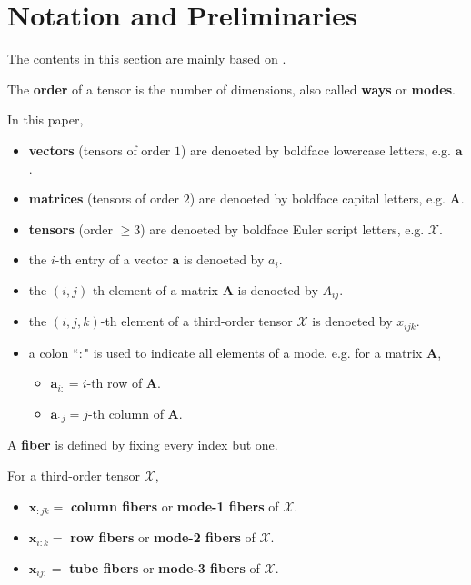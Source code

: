 \documentclass[preprint]{elsarticle}
\begin{document}
\section{Notation and Preliminaries}
\noindent The contents in this section are mainly based on \cite{Kolda2009}.
\begin{defn}
    The \textbf{order} of a tensor is the number of dimensions, also called \textbf{ways} or \textbf{modes}.
\end{defn}
In this paper,
\begin{itemize}
    \item \textbf{vectors} (tensors of order $1$) are denoeted by boldface lowercase letters, e.g. $\mathbf{a}$.
    \item \textbf{matrices} (tensors of order $2$) are denoeted by boldface capital letters, e.g. $\mathbf{A}$.
    \item \textbf{tensors} (order $\geq 3$) are denoeted by boldface Euler script letters, e.g. $\boldsymbol{\mathscr{X}}$.
    \item the $i$-th entry of a vector $\mathbf{a}$ is denoeted by $a_i$.
    \item the $(i,j)$-th element of a matrix $\mathbf{A}$ is denoeted by $A_{ij}$.
    \item the $(i,j,k)$-th element of a third-order tensor $\boldsymbol{\mathscr{X}}$ is denoeted by $x_{ijk}$.
    \item a colon ``$:$" is used to indicate all elements of a mode. e.g. for a matrix $\mathbf{A}$,
    \begin{itemize}
        \item $\mathbf{a}_{i:} = i$-th row of $\mathbf{A}$.
        \item $\mathbf{a}_{:j} = j$-th column of $\mathbf{A}$.
    \end{itemize}
\end{itemize}
\begin{defn}
    A \textbf{fiber} is defined by fixing every index but one.
\end{defn}
For a third-order tensor $\boldsymbol{\mathscr{X}}$,
\begin{itemize}
    \item $\mathbf{x}_{:jk}=$ \textbf{column fibers} or \textbf{mode-1 fibers}  of $\boldsymbol{\mathscr{X}}$.
    \item $\mathbf{x}_{i:k}=$ \textbf{row fibers} or \textbf{mode-2 fibers}  of $\boldsymbol{\mathscr{X}}$.
    \item $\mathbf{x}_{ij:}=$ \textbf{tube fibers} or \textbf{mode-3 fibers}  of $\boldsymbol{\mathscr{X}}$.
\end{itemize}
\end{document}
